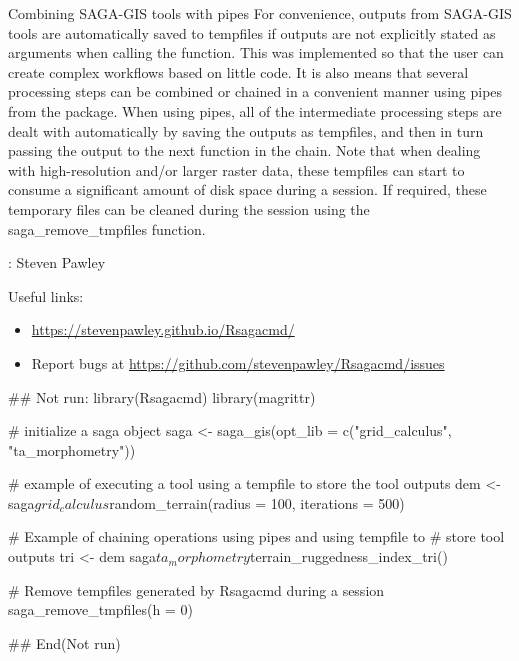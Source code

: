 \documentclass[a4paper]{book}
\begin{document}
%
\begin{Section}{Combining SAGA-GIS tools with pipes}
For convenience, outputs from
SAGA-GIS tools are automatically saved to tempfiles if outputs are not
explicitly stated as arguments when calling the function. This was
implemented so that the user can create complex workflows based on little
code. It is also means that several processing steps can be combined or
chained in a convenient manner using pipes from the  package.
When using pipes, all of the intermediate processing steps are dealt with
automatically by saving the outputs as tempfiles, and then in turn passing
the output to the next function in the chain. Note that when dealing with
high-resolution and/or larger raster data, these tempfiles can start to
consume a significant amount of disk space during a session. If required,
these temporary files can be cleaned during the session using the
saga\_remove\_tmpfiles function.
\end{Section}
%
\begin{Author}
: Steven Pawley 

\end{Author}
%
\begin{SeeAlso}
Useful links:
\begin{itemize}

\item{} \url{https://stevenpawley.github.io/Rsagacmd/}
\item{} Report bugs at \url{https://github.com/stevenpawley/Rsagacmd/issues}

\end{itemize}


\end{SeeAlso}
%
\begin{Examples}
\begin{ExampleCode}
## Not run: 
library(Rsagacmd)
library(magrittr)

# initialize a saga object
saga <- saga_gis(opt_lib = c("grid_calculus", "ta_morphometry"))

# example of executing a tool using a tempfile to store the tool outputs
dem <- saga$grid_calculus$random_terrain(radius = 100, iterations = 500)

# Example of chaining operations using pipes and using tempfile to
# store tool outputs
tri <- dem %
  saga$ta_morphometry$terrain_ruggedness_index_tri()

# Remove tempfiles generated by Rsagacmd during a session
saga_remove_tmpfiles(h = 0)

## End(Not run)
\end{ExampleCode}
\end{Examples}
\end{document}
